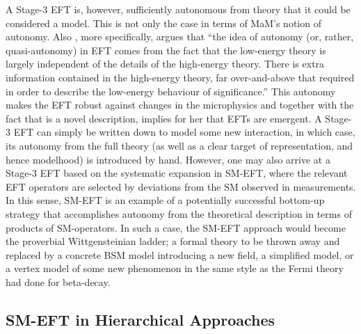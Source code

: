A Stage-3 EFT is, however, sufficiently autonomous from theory that it could be considered a model. 
This is not only the case in terms of MaM's notion of autonomy. 
Also \citet{Crowther2016-CROESU}, more specifically, argues 
that ``the idea of autonomy (or, rather, quasi-autonomy) in EFT comes from the fact that the low-energy theory is largely independent of the details of the high-energy theory. There is extra information contained in the high-energy theory, far over-and-above that required in order to describe the low-energy behaviour of significance.'' 
This autonomy makes the EFT robust against changes in the microphysics and together with the fact that is a novel description, implies for her that EFTs are emergent.  
A Stage-3 EFT can simply be written down to model some new interaction, in which case, its autonomy from the full theory (as well as a clear target of representation, and hence modelhood) is introduced by hand. 
However, one may also arrive at a Stage-3 EFT based on the systematic expansion in SM-EFT, where the relevant EFT operators are selected by deviations from the SM observed in measurements. 
In this sense, SM-EFT is an example of a potentially successful bottom-up strategy that accomplishes autonomy from the theoretical description in terms of products of SM-operators. 
In such a case, the SM-EFT approach would become the proverbial Wittgensteinian ladder; a formal theory to be thrown away and replaced by a concrete BSM model introducing a new field, a simplified model, or a vertex model of some new phenomenon in the same style as the Fermi theory had done for beta-decay.


\subsection{SM-EFT in Hierarchical Approaches}
\label{sub:modelhood}

